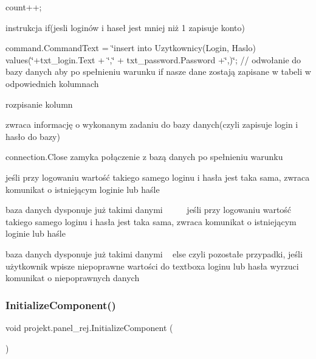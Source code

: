 count++;

instrukcja if(jesli loginów i haseł jest mniej niż 1 zapisuje konto)

command.\+Command\+Text = \char`\"{}insert into Uzytkownicy(\+Login, Haslo) values(\textquotesingle{}\char`\"{}+txt\+\_\+login.Text + \char`\"{}\textquotesingle{},\textquotesingle{}\char`\"{} + txt\+\_\+password.\+Password +\char`\"{}\textquotesingle{},)\char`\"{}; // odwołanie do bazy danych aby po spełnieniu warunku if nasze dane zostają zapisane w tabeli w odpowiednich kolumnach

rozpisanie kolumn

zwraca informację o wykonanym zadaniu do bazy danych(czyli zapisuje login i hasło do bazy)

connection.\+Close zamyka połączenie z bazą danych po spełnieniu warunku

jeśli przy logowaniu wartość takiego samego loginu i hasła jest taka sama, zwraca komunikat o istniejącym loginie lub haśle

baza danych dysponuje już takimi danymi ~\newline
~\newline
~\newline
 jeśli przy logowaniu wartość takiego samego loginu i hasła jest taka sama, zwraca komunikat o istniejącym loginie lub haśle

baza danych dysponuje już takimi danymi ~\newline
 else czyli pozostałe przypadki, jeśli użytkownik wpisze niepoprawne wartości do textboxa loginu lub hasła wyrzuci komunikat o niepoprawnych danych \mbox{\label{classprojekt_1_1panel__rej_a603f590d84827e1d551b3f781d6c1f28}} 
\subsubsection{\texorpdfstring{Initialize\+Component()}{InitializeComponent()}\hspace{0.1cm}{\footnotesize\ttfamily [1/9]}}
{\footnotesize\ttfamily void projekt.\+panel\+\_\+rej.\+Initialize\+Component (\begin{DoxyParamCaption}{ }\end{DoxyParamCaption})\hspace{0.3cm}{\ttfamily [inline]}}



